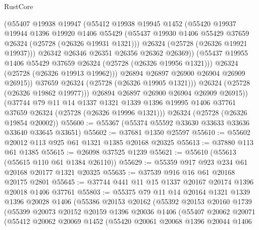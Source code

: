 \begin{lexlean}{RustCore}
\begin{coremodule}
                  (@55407
                    @19938
                    @19947
                    (@55412
                      @19938
                      @19945
                      @1452
                      (@55420
                        @19937
                        @19944
                        @1396
                        @19920
                        @1406
                        @55429
                        (@55437 @19930 @1406 @55429 @37659 @26324 (@25728 (@26326 @19931 @1321)))
                        @26324
                        (@25728 (@26326 @19921 @19937)))
                      @26342
                      @26346
                      @26351
                      @26356
                      @26362
                      @26369))
                  (@55437 @19955 @1406 @55429 @37659 @26324 (@25728 (@26326 @19956 @1321)))
                  @26324
                  (@25728 (@26326 @19913 @19962)))
                @26894
                @26897
                @26900
                @26904
                @26909
                @26915))
            @37659
            @26324
            (@25728 (@26326 @19905 @1321)))
          @26324
          (@25728 (@26326 @19862 @19977)))
        @26894
        @26897
        @26900
        @26904
        @26909
        @26915))
    (@37744
      @79
      @11
      @14
      @1337
      @1321
      @1339
      @1396
      @19995
      @1406
      @37761
      @37659
      @26324
      (@25728 (@26326 @19996 @1321)))
    @26324
    (@25728 (@26326 @19854 @20002))
@55600 := @55367 (@55374 @55592 @33630 @33633 @33636 @33640 @33645 @33651)
@55602 := @37681 @1350 @25597
@55610 := @55602 @20012 @113 @925 @61 @1321 @1385 @20168 @20325
@55613 := @37880 @113 @61 @1385
@55615 := @26098 @37525 @1239
@55621 := @55610 (@55613 (@55615 @110 @61 @1384 @26110))
@55629 := @55359 @917 @923 @234 @61 @20168 @20177 @1321 @20325
@55635 := @37539 @916 @16 @61 @20168 @20175 @2801
@55645 := @37744 @441 @11 @15 @1337 @20167 @20174 @1396 @20018 @1406 @37761
@55803 := @55375
    @79
    @11
    @14
    @20164
    @1321
    @1339
    @1396
    @20028
    @1406
    (@55386
      @20153
      @20162
      (@55392
        @20153
        @20160
        @1739
        (@55399
          @20073
          @20152
          @20159
          @1396
          @20036
          @1406
          (@55407
            @20062
            @20071
            (@55412
              @20062
              @20069
              @1452
              (@55420
                @20061
                @20068
                @1396
                @20044
                @1406

\end{coremodule}
\end{lexlean}
